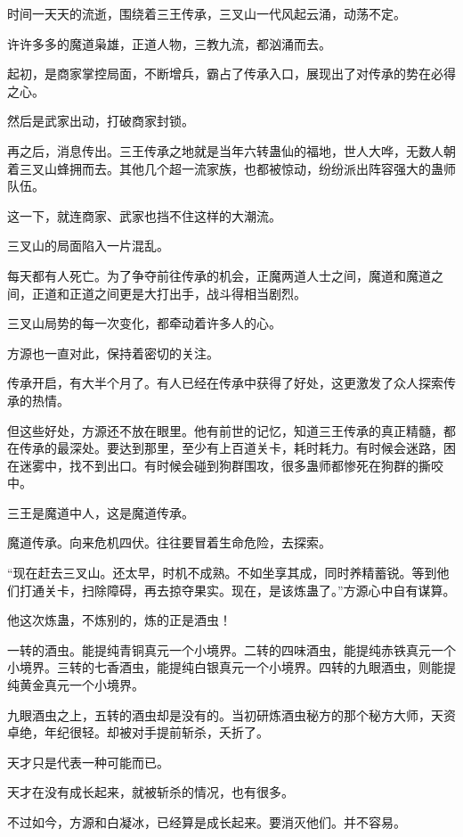 
\begin{this_body}

时间一天天的流逝，围绕着三王传承，三叉山一代风起云涌，动荡不定。

许许多多的魔道枭雄，正道人物，三教九流，都汹涌而去。

起初，是商家掌控局面，不断增兵，霸占了传承入口，展现出了对传承的势在必得之心。

然后是武家出动，打破商家封锁。

再之后，消息传出。三王传承之地就是当年六转蛊仙的福地，世人大哗，无数人朝着三叉山蜂拥而去。其他几个超一流家族，也都被惊动，纷纷派出阵容强大的蛊师队伍。

这一下，就连商家、武家也挡不住这样的大潮流。

三叉山的局面陷入一片混乱。

每天都有人死亡。为了争夺前往传承的机会，正魔两道人士之间，魔道和魔道之间，正道和正道之间更是大打出手，战斗得相当剧烈。

三叉山局势的每一次变化，都牵动着许多人的心。

方源也一直对此，保持着密切的关注。

传承开启，有大半个月了。有人已经在传承中获得了好处，这更激发了众人探索传承的热情。

但这些好处，方源还不放在眼里。他有前世的记忆，知道三王传承的真正精髓，都在传承的最深处。要达到那里，至少有上百道关卡，耗时耗力。有时候会迷路，困在迷雾中，找不到出口。有时候会碰到狗群围攻，很多蛊师都惨死在狗群的撕咬中。

三王是魔道中人，这是魔道传承。

魔道传承。向来危机四伏。往往要冒着生命危险，去探索。

“现在赶去三叉山。还太早，时机不成熟。不如坐享其成，同时养精蓄锐。等到他们打通关卡，扫除障碍，再去掠夺果实。现在，是该炼蛊了。”方源心中自有谋算。

他这次炼蛊，不炼别的，炼的正是酒虫！

一转的酒虫。能提纯青铜真元一个小境界。二转的四味酒虫，能提纯赤铁真元一个小境界。三转的七香酒虫，能提纯白银真元一个小境界。四转的九眼酒虫，则能提纯黄金真元一个小境界。

九眼酒虫之上，五转的酒虫却是没有的。当初研炼酒虫秘方的那个秘方大师，天资卓绝，年纪很轻。却被对手提前斩杀，夭折了。

天才只是代表一种可能而已。

天才在没有成长起来，就被斩杀的情况，也有很多。

不过如今，方源和白凝冰，已经算是成长起来。要消灭他们。并不容易。


\end{this_body}
